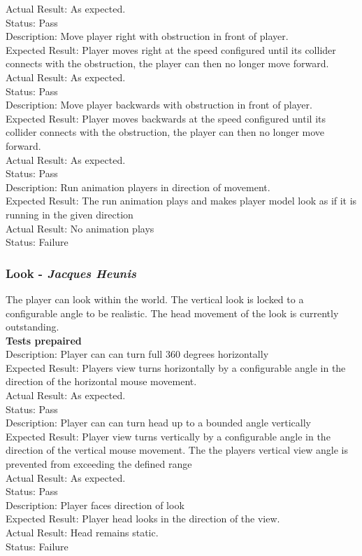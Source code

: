 \documentclass[a4paper,10pt]{article}
\begin{document}
Actual Result:  As expected.\\
Status: Pass
\smallskip\\
Description: Move player right with obstruction in front of player.\\
Expected Result: Player moves right at the speed configured until its collider connects with the obstruction, the player can then no longer move forward.\\
Actual Result:  As expected.\\
Status: Pass
\smallskip\\
Description: Move player backwards with obstruction in front of player.\\
Expected Result: Player moves backwards at the speed configured until its collider connects with the obstruction, the player can then no longer move forward.\\
Actual Result:  As expected.\\
Status: Pass
\smallskip\\
Description: Run animation players in direction of movement.\\
Expected Result: The run animation plays and makes player model look as if it is running in the given direction\\
Actual Result: No animation plays\\
Status: Failure
\subsubsection{Look - \textit{Jacques Heunis}}
The player can look within the world. The vertical look is locked to a configurable angle to be realistic. The head movement of the look is currently outstanding.
\smallskip\\\textbf{Tests prepaired}\\
Description: Player can can turn full 360 degrees horizontally\\
Expected Result: Players view turns horizontally by a configurable angle in the direction of the horizontal mouse movement.\\
Actual Result:  As expected.\\
Status: Pass
\smallskip\\
Description: Player can can turn head up to a bounded angle vertically\\
Expected Result: Player view turns vertically by a configurable angle in the direction of the vertical mouse movement. The the players vertical view angle is prevented from exceeding the defined range\\
Actual Result:  As expected.\\
Status: Pass
\smallskip\\
Description: Player faces direction of look\\
Expected Result: Player head looks in the direction of the view.\\
Actual Result:  Head remains static.\\
Status: Failure
\end{document}
